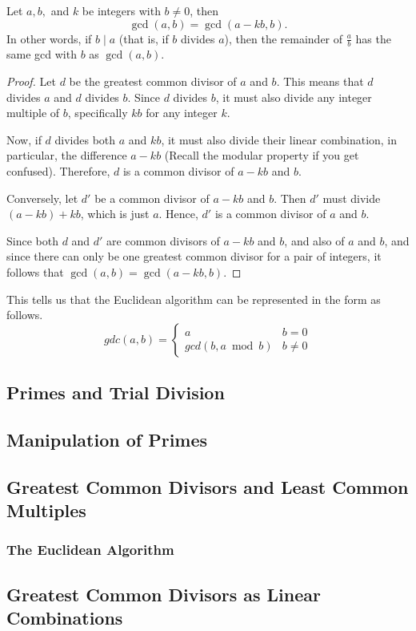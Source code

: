         \begin{corollary}
            Let \( a, b, \) and \( k \) be integers with \( b \neq 0 \), then 
            \[ \gcd(a, b) = \gcd(a - kb, b). \]
            In other words, if \( b \mid a \) (that is, if \( b \) divides \( a \)), then the remainder of \( \frac{a}{b} \) has the same gcd with \( b \) as \( \gcd(a, b) \).
        \end{corollary}
        \begin{proof}
            Let \( d \) be the greatest common divisor of \( a \) and \( b \). This means that \( d \) divides \( a \) and \( d \) divides \( b \). Since \( d \) divides \( b \), it must also divide any integer multiple of \( b \), specifically \( kb \) for any integer \( k \). 
            
            Now, if \( d \) divides both \( a \) and \( kb \), it must also divide their linear combination, in particular, the difference \( a - kb \) (Recall the modular property if you get confused). 
            Therefore, \( d \) is a common divisor of \( a - kb \) and \( b \).
            
            Conversely, let \( d' \) be a common divisor of \( a - kb \) and \( b \). Then \( d' \) must divide \( (a - kb) + kb \), which is just \( a \). Hence, \( d' \) is a common divisor of \( a \) and \( b \).
            
            Since both \( d \) and \( d' \) are common divisors of \( a - kb \) and \( b \), and also of \( a \) and \( b \), and since there can only be one greatest common divisor for a pair of integers, it follows that \( \gcd(a, b) = \gcd(a - kb, b) \).
        \end{proof}
        This tells us that the Euclidean algorithm can be represented in the form as follows.
        \begin{equation}
        gdc( a,b) =\begin{cases}
        a & b=0\\
        gcd( b,a\bmod b) & b\neq 0
        \end{cases}
        \end{equation}
    \subsection{Primes and Trial Division}

    \subsection{Manipulation of Primes}

    \subsection{Greatest Common Divisors and Least Common Multiples}

    \subsubsection*{The Euclidean Algorithm}

    \subsection{Greatest Common Divisors as Linear Combinations}
